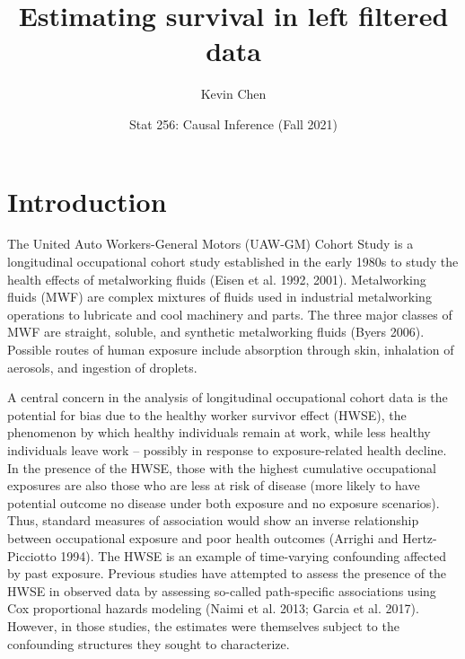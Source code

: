 \documentclass[
  11pt,
]{article}
\title{Estimating survival in left filtered data}
\author{Kevin Chen}
\date{Stat 256: Causal Inference (Fall 2021)}
\renewcommand{\headrulewidth}{0pt}
\begin{document}
\maketitle

\fancyhead[L]{}
\renewcommand{\headrulewidth}{0pt}

\onehalfspacing
\renewcommand{\arraystretch}{1.1}

\thispagestyle{empty}

\setlength{\columnseprule}{0pt}

\hypertarget{introduction}{%
\section{Introduction}\label{introduction}}

The United Auto Workers-General Motors (UAW-GM) Cohort Study is a
longitudinal occupational cohort study established in the early 1980s to
study the health effects of metalworking fluids (Eisen et al. 1992,
2001). Metalworking fluids (MWF) are complex mixtures of fluids used in
industrial metalworking operations to lubricate and cool machinery and
parts. The three major classes of MWF are straight, soluble, and
synthetic metalworking fluids (Byers 2006). Possible routes of human
exposure include absorption through skin, inhalation of aerosols, and
ingestion of droplets.

A central concern in the analysis of longitudinal occupational cohort
data is the potential for bias due to the healthy worker survivor effect
(HWSE), the phenomenon by which healthy individuals remain at work,
while less healthy individuals leave work -- possibly in response to
exposure-related health decline. In the presence of the HWSE, those with
the highest cumulative occupational exposures are also those who are
less at risk of disease (more likely to have potential outcome no
disease under both exposure and no exposure scenarios). Thus, standard
measures of association would show an inverse relationship between
occupational exposure and poor health outcomes (Arrighi and
Hertz-Picciotto 1994). The HWSE is an example of time-varying
confounding affected by past exposure. Previous studies have attempted
to assess the presence of the HWSE in observed data by assessing
so-called path-specific associations using Cox proportional hazards
modeling (Naimi et al. 2013; Garcia et al. 2017). However, in those
studies, the estimates were themselves subject to the confounding
structures they sought to characterize.
\end{document}
